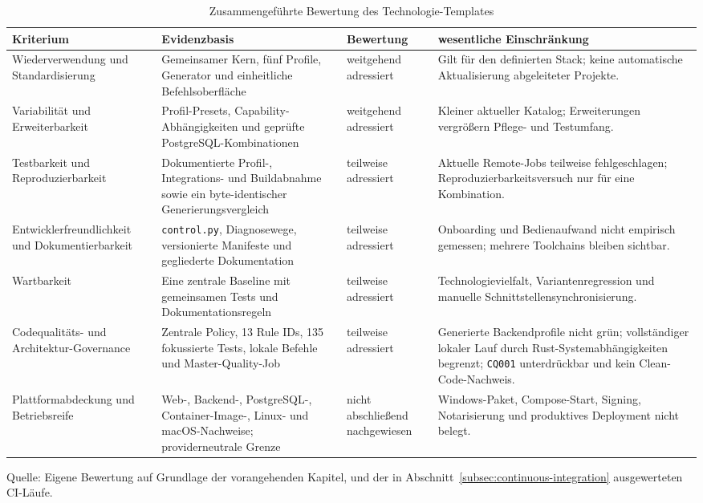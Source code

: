 \begin{table}[htbp]
  \centering
  \scriptsize
  \renewcommand{\arraystretch}{1.08}
  \caption{Zusammengeführte Bewertung des Technologie-Templates}
  \label{tab:template-evaluation}
  \begin{tabularx}{\textwidth}{@{}>{\raggedright\arraybackslash}p{}>{\raggedright\arraybackslash}p{}>{\raggedright\arraybackslash}p{}>{\raggedright\arraybackslash}X@{}}
    \toprule
    \textbf{Kriterium} & \textbf{Evidenzbasis} & \textbf{Bewertung} &
      \textbf{wesentliche Einschränkung} \\
    \midrule
    Wiederverwendung und Standardisierung & Gemeinsamer Kern, fünf Profile,
      Generator und einheitliche Befehlsoberfläche & weitgehend adressiert &
      Gilt für den definierten Stack; keine automatische Aktualisierung
      abgeleiteter Projekte. \\
    Variabilität und Erweiterbarkeit & Profil-Presets, Capability-Abhängigkeiten
      und geprüfte PostgreSQL-Kombinationen & weitgehend adressiert & Kleiner
      aktueller Katalog; Erweiterungen vergrößern Pflege- und Testumfang. \\
    Testbarkeit und Reproduzierbarkeit & Dokumentierte Profil-, Integrations-
      und Buildabnahme sowie ein byte-identischer Generierungsvergleich &
      teilweise adressiert & Aktuelle Remote-Jobs teilweise fehlgeschlagen;
      Reproduzierbarkeitsversuch nur für eine Kombination. \\
    Entwicklerfreundlichkeit und Dokumentierbarkeit & \texttt{control.py},
      Diagnosewege, versionierte Manifeste und gegliederte Dokumentation &
      teilweise adressiert & Onboarding und Bedienaufwand nicht empirisch
      gemessen; mehrere Toolchains bleiben sichtbar. \\
    Wartbarkeit & Eine zentrale Baseline mit gemeinsamen Tests und
      Dokumentationsregeln & teilweise adressiert & Technologievielfalt,
      Variantenregression und manuelle Schnittstellensynchronisierung. \\
    Codequalitäts- und Architektur-Governance & Zentrale Policy, 13 Rule IDs,
      135 fokussierte Tests, lokale Befehle und Master-Quality-Job &
      teilweise adressiert & Generierte Backendprofile nicht grün;
      vollständiger lokaler Lauf durch Rust-Systemabhängigkeiten begrenzt;
      \texttt{CQ001} unterdrückbar und kein Clean-Code-Nachweis. \\
    Plattformabdeckung und Betriebsreife & Web-, Backend-, PostgreSQL-,
      Container-Image-, Linux- und macOS-Nachweise; providerneutrale Grenze &
      nicht abschließend nachgewiesen & Windows-Paket, Compose-Start, Signing,
      Notarisierung und produktives Deployment nicht belegt. \\
    \bottomrule
  \end{tabularx}
  \smallskip
  {\footnotesize Quelle: Eigene Bewertung auf Grundlage der vorangehenden
  Kapitel, \textcite{kleiveist2026acceptance} und der in
  Abschnitt~\ref{subsec:continuous-integration} ausgewerteten CI-Läufe.\par}
\end{table}
